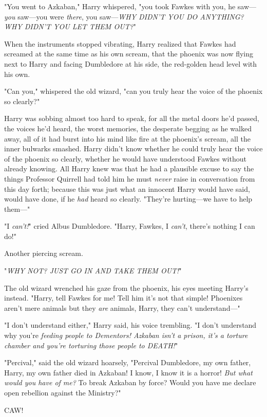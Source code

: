 "You went to Azkaban," Harry whispered, "you took Fawkes with you, he
saw---\emph{you} saw---you were \emph{there}, you saw---\emph{WHY DIDN'T YOU DO
ANYTHING? WHY DIDN'T YOU LET THEM OUT?}"

When the instruments stopped vibrating, Harry realized that Fawkes had screamed
at the same time as his own scream, that the phoenix was now flying next to
Harry and facing Dumbledore at his side, the red-golden head level with his own.

"Can you," whispered the old wizard, "can you truly hear the voice of the
phoenix so clearly?"

Harry was sobbing almost too hard to speak, for all the metal doors he'd
passed, the voices he'd heard, the worst memories, the desperate begging as he
walked away, all of it had burst into his mind like fire at the phoenix's
scream, all the inner bulwarks smashed. Harry didn't know whether he could
truly hear the voice of the phoenix so clearly, whether he would have
understood Fawkes without already knowing. All Harry knew was that he had a
plausible excuse to say the things Professor Quirrell had told him he must
\emph{never} raise in conversation from this day forth; because this was just
what an innocent Harry would have said, would have done, if he \emph{had} heard
so clearly. "They're hurting---we have to help them---"

"I \emph{can't!}" cried Albus Dumbledore. "Harry, Fawkes, I \emph{can't},
there's nothing I can do!"

Another piercing scream.

"\emph{WHY NOT? JUST GO IN AND TAKE THEM OUT!}"

The old wizard wrenched his gaze from the phoenix, his eyes meeting Harry's
instead. "Harry, tell Fawkes for me! Tell him it's not that simple! Phoenixes
aren't mere animals but they \emph{are} animals, Harry, they can't
understand---"

"I don't understand either," Harry said, his voice trembling. "I don't
understand why you're \emph{feeding people to Dementors! Azkaban isn't a
prison, it's a torture chamber and you're torturing those people to DEATH!}"

"Percival," said the old wizard hoarsely, "Percival Dumbledore, my own father,
Harry, my own father died in Azkaban! I know, I know it is a horror! \emph{But
what would you have of me?} To break Azkaban by force? Would you have me
declare open rebellion against the Ministry?"

CAW!

